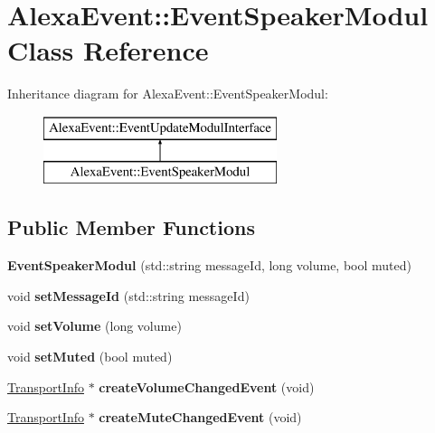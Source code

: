 \hypertarget{classAlexaEvent_1_1EventSpeakerModul}{}\section{Alexa\+Event\+:\+:Event\+Speaker\+Modul Class Reference}
\label{classAlexaEvent_1_1EventSpeakerModul}
Inheritance diagram for Alexa\+Event\+:\+:Event\+Speaker\+Modul\+:\begin{figure}[H]
\begin{center}
\leavevmode
\includegraphics[height=2.000000cm]{dd/ddd/classAlexaEvent_1_1EventSpeakerModul}
\end{center}
\end{figure}
\subsection*{Public Member Functions}
\begin{DoxyCompactItemize}
\item 
\mbox{\label{classAlexaEvent_1_1EventSpeakerModul_ad94b748e06388fea401d6c75bac99706}} 
{\bfseries Event\+Speaker\+Modul} (std\+::string message\+Id, long volume, bool muted)
\item 
\mbox{\label{classAlexaEvent_1_1EventSpeakerModul_ad1875db382e1c76d2ba8dba6b0d9940a}} 
void {\bfseries set\+Message\+Id} (std\+::string message\+Id)
\item 
\mbox{\label{classAlexaEvent_1_1EventSpeakerModul_a7d8ade21ed1bb1ae4c73b58242ac916a}} 
void {\bfseries set\+Volume} (long volume)
\item 
\mbox{\label{classAlexaEvent_1_1EventSpeakerModul_a2ed62a97902f7a8aa360f5acef837342}} 
void {\bfseries set\+Muted} (bool muted)
\item 
\mbox{\label{classAlexaEvent_1_1EventSpeakerModul_a58f0473e66bf9af6b9bcab50276935e7}} 
\hyperlink{classAlexaEvent_1_1TransportInfo}{Transport\+Info} $\ast$ {\bfseries create\+Volume\+Changed\+Event} (void)
\item 
\mbox{\label{classAlexaEvent_1_1EventSpeakerModul_a981c868bc613c046e36cdf6a596c6665}} 
\hyperlink{classAlexaEvent_1_1TransportInfo}{Transport\+Info} $\ast$ {\bfseries create\+Mute\+Changed\+Event} (void)
\end{DoxyCompactItemize}
